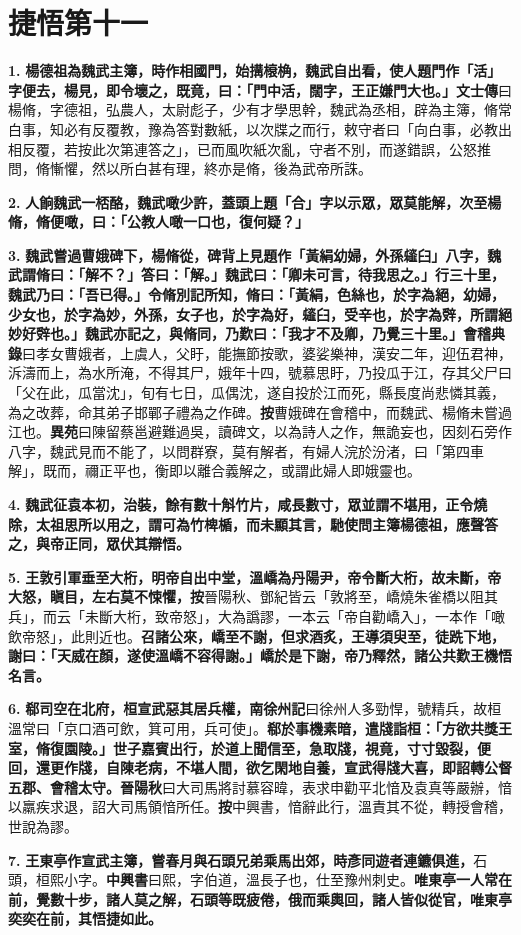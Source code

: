 \chapter{捷悟第十一}

\textbf{1.} \textbf{楊德祖為魏武主簿，時作相國門，始搆榱桷，魏武自出看，使人題門作「活」字便去，楊見，即令壞之，既竟，曰：「門中活，闊字，王正嫌門大也。」}{\footnotesize \textbf{文士傳}曰楊脩，字德祖，弘農人，太尉彪子，少有才學思幹，魏武為丞相，辟為主簿，脩常白事，知必有反覆教，豫為答對數紙，以次牒之而行，敕守者曰「向白事，必教出相反覆，若按此次第連答之」，已而風吹紙次亂，守者不別，而遂錯誤，公怒推問，脩慚懼，然以所白甚有理，終亦是脩，後為武帝所誅。}

\textbf{2.} \textbf{人餉魏武一桮酪，魏武噉少許，蓋頭上題「合」字以示眾，眾莫能解，次至楊脩，脩便噉，曰：「公教人噉一口也，復何疑？」}

\textbf{3.} \textbf{魏武嘗過曹娥碑下，楊脩從，碑背上見題作「黃絹幼婦，外孫䪢臼」八字，魏武謂脩曰：「解不？」答曰：「解。」魏武曰：「卿未可言，待我思之。」行三十里，魏武乃曰：「吾已得。」令脩別記所知，脩曰：「黃絹，色絲也，於字為絕，幼婦，少女也，於字為妙，外孫，女子也，於字為好，䪢臼，受辛也，於字為辤，所謂絕妙好辤也。」魏武亦記之，與脩同，乃歎曰：「我才不及卿，乃覺三十里。」}{\footnotesize \textbf{會稽典錄}曰孝女曹娥者，上虞人，父盱，能撫節按歌，婆娑樂神，漢安二年，迎伍君神，泝濤而上，為水所淹，不得其尸，娥年十四，號慕思盱，乃投瓜于江，存其父尸曰「父在此，瓜當沈」，旬有七日，瓜偶沈，遂自投於江而死，縣長度尚悲憐其義，為之改葬，命其弟子邯鄲子禮為之作碑。\textbf{按}曹娥碑在會稽中，而魏武、楊脩未嘗過江也。\textbf{異苑}曰陳留蔡邕避難過吳，讀碑文，以為詩人之作，無詭妄也，因刻石旁作八字，魏武見而不能了，以問群寮，莫有解者，有婦人浣於汾渚，曰「第四車解」，既而，禰正平也，衡即以離合義解之，或謂此婦人即娥靈也。}

\textbf{4.} \textbf{魏武征袁本初，治裝，餘有數十斛竹片，咸長數寸，眾並謂不堪用，正令燒除，太祖思所以用之，謂可為竹椑楯，而未顯其言，馳使問主簿楊德祖，應聲答之，與帝正同，眾伏其辯悟。}

\textbf{5.} \textbf{王敦引軍垂至大桁，明帝自出中堂，溫嶠為丹陽尹，帝令斷大桁，故未斷，帝大怒，瞋目，左右莫不悚懼，}{\footnotesize \textbf{按}晉陽秋、鄧紀皆云「敦將至，嶠燒朱雀橋以阻其兵」，而云「未斷大桁，致帝怒」，大為譌謬，一本云「帝自勸嶠入」，一本作「噉飲帝怒」，此則近也。}\textbf{召諸公來，嶠至不謝，但求酒炙，王導須臾至，徒跣下地，謝曰：「天威在顏，遂使溫嶠不容得謝。」嶠於是下謝，帝乃釋然，諸公共歎王機悟名言。}

\textbf{6.} \textbf{郗司空在北府，桓宣武惡其居兵權，}{\footnotesize \textbf{南徐州記}曰徐州人多勁悍，號精兵，故桓溫常曰「京口酒可飲，箕可用，兵可使」。}\textbf{郗於事機素暗，遣牋詣桓：「方欲共獎王室，脩復園陵。」世子嘉賓出行，於道上聞信至，急取牋，視竟，寸寸毀裂，便回，還更作牋，自陳老病，不堪人間，欲乞閑地自養，宣武得牋大喜，即詔轉公督五郡、會稽太守。}{\footnotesize \textbf{晉陽秋}曰大司馬將討慕容暐，表求申勸平北愔及袁真等嚴辦，愔以羸疾求退，詔大司馬領愔所任。\textbf{按}中興書，愔辭此行，溫責其不從，轉授會稽，世說為謬。}

\textbf{7.} \textbf{王東亭作宣武主簿，嘗春月與石頭兄弟乘馬出郊，時彥同遊者連鑣俱進，}{\footnotesize 石頭，桓熙小字。\textbf{中興書}曰熙，字伯道，溫長子也，仕至豫州刺史。}\textbf{唯東亭一人常在前，覺數十步，諸人莫之解，石頭等既疲倦，俄而乘輿回，諸人皆似從官，唯東亭奕奕在前，其悟捷如此。}
